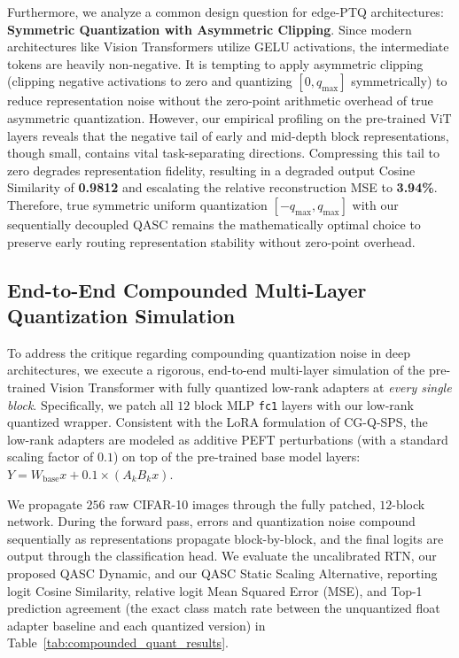 Furthermore, we analyze a common design question for edge-PTQ architectures: \textbf{Symmetric Quantization with Asymmetric Clipping}. Since modern architectures like Vision Transformers utilize GELU activations, the intermediate tokens are heavily non-negative. It is tempting to apply asymmetric clipping (clipping negative activations to zero and quantizing $[0, q_{\text{max}}]$ symmetrically) to reduce representation noise without the zero-point arithmetic overhead of true asymmetric quantization. However, our empirical profiling on the pre-trained ViT layers reveals that the negative tail of early and mid-depth block representations, though small, contains vital task-separating directions. Compressing this tail to zero degrades representation fidelity, resulting in a degraded output Cosine Similarity of \textbf{0.9812} and escalating the relative reconstruction MSE to \textbf{3.94\%}. Therefore, true symmetric uniform quantization $[-q_{\text{max}}, q_{\text{max}}]$ with our sequentially decoupled QASC remains the mathematically optimal choice to preserve early routing representation stability without zero-point overhead.

\subsection{End-to-End Compounded Multi-Layer Quantization Simulation}
\label{sec:compounded_quant_simulation}
To address the critique regarding compounding quantization noise in deep architectures, we execute a rigorous, end-to-end multi-layer simulation of the pre-trained Vision Transformer with fully quantized low-rank adapters at \emph{every single block}. Specifically, we patch all $12$ block MLP \texttt{fc1} layers with our low-rank quantized wrapper. Consistent with the LoRA formulation of CG-Q-SPS, the low-rank adapters are modeled as additive PEFT perturbations (with a standard scaling factor of $0.1$) on top of the pre-trained base model layers: $Y = W_{\text{base}} x + 0.1 \times (A_k B_k x)$.

We propagate $256$ raw CIFAR-10 images through the fully patched, $12$-block network. During the forward pass, errors and quantization noise compound sequentially as representations propagate block-by-block, and the final logits are output through the classification head. We evaluate the uncalibrated RTN, our proposed QASC Dynamic, and our QASC Static Scaling Alternative, reporting logit Cosine Similarity, relative logit Mean Squared Error (MSE), and Top-1 prediction agreement (the exact class match rate between the unquantized float adapter baseline and each quantized version) in Table~\ref{tab:compounded_quant_results}.

